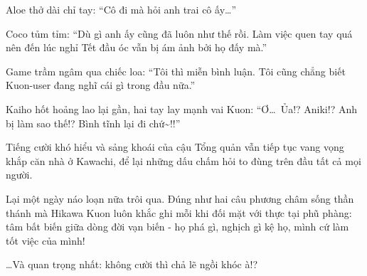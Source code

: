 \documentclass[../main.tex]{subfiles}
\begin{document}
Aloe thở dài chỉ tay: ``Cô đi mà hỏi anh trai cô ấy\dots''

Coco tủm tỉm: ``Dù gì anh ấy cũng đã luôn như thế rồi. Làm việc quen tay quá nên đến lúc nghỉ Tết đầu óc vẫn bị ám ảnh bởi họ đấy mà.''

Game trầm ngâm qua chiếc loa: ``Tôi thì miễn bình luận. Tôi cũng chẳng biết Kuon-user đang nghĩ cái gì trong đầu nữa.''

Kaiho hốt hoảng lao lại gần, hai tay lay mạnh vai Kuon: ``Ơ\dots\ Ủa!? Aniki!? Anh bị làm sao thế!? Bình tĩnh lại đi chứ\~{}!!''

Tiếng cười khó hiểu và sảng khoái của cậu Tổng quản vẫn tiếp tục vang vọng khắp căn nhà ở Kawachi, để lại những dấu chấm hỏi to đùng trên đầu tất cả mọi người.

Lại một ngày náo loạn nữa trôi qua. Đúng như hai câu phương châm sống thần thánh mà Hikawa Kuon luôn khắc ghi mỗi khi đối mặt với thực tại phũ phàng: tâm bất biến giữa dòng đời vạn biến - họ phá gì, nghịch gì kệ họ, mình cứ làm tốt việc của mình!

\dots Và quan trọng nhất: không cười thì chả lẽ ngồi khóc à!?
\end{document}
